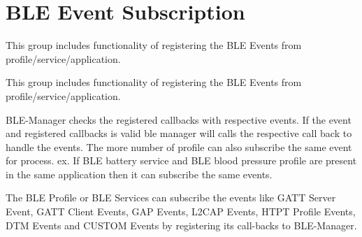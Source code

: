 \hypertarget{group__ble__manager__event__subscription}{}\section{B\+LE Event Subscription}
\label{group__ble__manager__event__subscription}


This group includes functionality of registering the B\+LE Events from profile/service/application.  


This group includes functionality of registering the B\+LE Events from profile/service/application. 

B\+L\+E-\/\+Manager checks the registered callbacks with respective events. If the event and registered callbacks is valid ble manager will calls the respective call back to handle the events. The more number of profile can also subscribe the same event for process. ex. If B\+LE battery service and B\+LE blood pressure profile are present in the same application then it can subscribe the same events.

The B\+LE Profile or B\+LE Services can subscribe the events like G\+A\+TT Server Event, G\+A\+TT Client Events, G\+AP Events, L2\+C\+AP Events, H\+T\+PT Profile Events, D\+TM Events and C\+U\+S\+T\+OM Events by registering its call-\/backs to B\+L\+E-\/\+Manager.